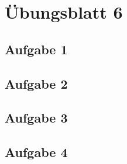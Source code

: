 \documentclass[aspectratio=169,usepdftitle=true,11pt,ngerman,t]{beamer}
\subtitle{Tutorium 7}
\date{29. November 2024}
\begin{document}
\section[Übungsblatt 6]{Übungsblatt 6}

\subsection{Aufgabe 1}


\subsection{Aufgabe 2}


\subsection{Aufgabe 3}


\subsection{Aufgabe 4}

\end{document}
